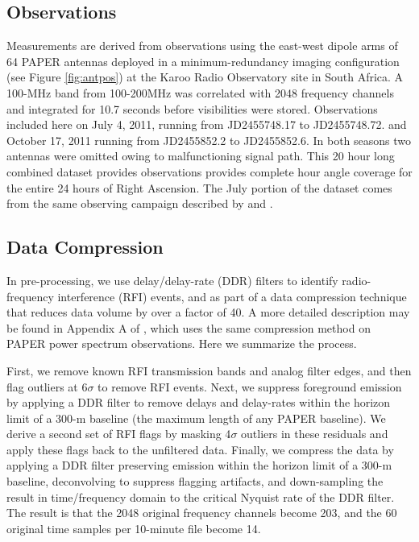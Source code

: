 \documentclass[preprint]{aastex}
\begin{document}
\subsection{Observations}

 Measurements are derived from observations using  the east-west dipole arms of
64 PAPER antennas deployed in a minimum-redundancy imaging configuration
(see Figure \ref{fig:antpos})
at the Karoo Radio Observatory site in South Africa.
A 100-MHz band from 100-200MHz was correlated
with 2048 frequency channels and integrated for 10.7 seconds before
visibilities were stored.  Observations included here on  July 4, 2011, running
from JD2455748.17 to JD2455748.72. and October 17, 2011 running from
JD2455852.2 to JD2455852.6.  In both seasons two antennas were omitted owing to
malfunctioning signal path. This 20 hour long combined dataset provides
observations provides complete hour angle coverage for the entire 24 hours of
Right Ascension. The July portion of the dataset comes from the same observing
campaign described by \cite{Pober:2013p9567} and \cite{Stefan:2012p9707}. 

\subsection{Data Compression}

In pre-processing, we use delay/delay-rate (DDR) filters
\citep{Parsons:2009p7859} to identify radio-frequency interference (RFI)
events, and as part of a data compression technique that reduces data volume by
over a factor of 40.  A more detailed description may be found in Appendix A of
\cite{Parsons:2013p9876}, which uses the same compression method on PAPER power
spectrum observations. Here we summarize the process.

First, we remove known RFI transmission bands and analog filter edges, and then
flag outliers at 6$\sigma$ to remove RFI events.  Next, we suppress foreground
emission by applying a DDR filter to remove delays and delay-rates within the
horizon limit of a 300-m baseline (the maximum length of any PAPER baseline).
We derive a second set of RFI flags by masking 4$\sigma$ outliers in these
residuals and apply these flags back to the unfiltered data.  Finally, we
compress the data by applying a DDR filter preserving emission within the
horizon limit of a 300-m baseline, deconvolving to suppress flagging artifacts,
and down-sampling the result in time/frequency domain to the critical Nyquist
rate of the DDR filter.  The result is that the 2048 original frequency
channels become 203, and the 60 original time samples per 10-minute file become
14. 
\end{document}
